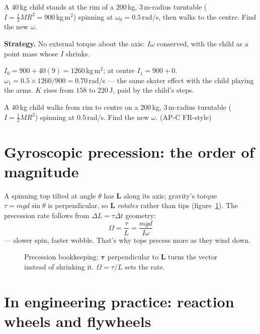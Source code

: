\begin{example}\label{ex:turntable}
A $40$\,kg child stands at the rim of a $200$\,kg, $3$\,m-radius
turntable ($I=\tfrac12MR^{2}=900$\,kg\,m$^{2}$) spinning at
$\omega_0=0.5$\,rad/s, then walks to the centre. Find the new $\omega$.
\par\smallskip
\textbf{Strategy.} No external torque about the axis: $I\omega$ conserved,
with the child as a point mass whose $I$ shrinks.
\begin{solution}
$I_0=900+40(9)=1260$\,kg\,m$^{2}$; at centre $I_1=900+0$.
$\omega_1=0.5\times1260/900=0.70$\,rad/s --- the same skater effect with
the child playing the arms. $K$ rises from $158$ to $220$\,J, paid by the
child's steps. \checkmark
\end{solution}
\end{example}

\begin{exercise}[medium]
A $40$\,kg child walks from rim to centre on a $200$\,kg, $3$\,m-radius
turntable ($I=\tfrac12MR^{2}$) spinning at $0.5$\,rad/s. Find the new
$\omega$. (AP-C FR-style)
\end{exercise}

\section{Gyroscopic precession: the order of magnitude}\label{sec:ang-gyro}

A spinning top tilted at angle $\theta$ has $\mathbf L$ along its axis;
gravity's torque $\tau=mgd\sin\theta$ is perpendicular, so $\mathbf L$
\emph{rotates} rather than tips (figure~\ref{fig:gyro}). The precession
rate follows from $\Delta L=\tau\Delta t$ geometry:
\[
  \Omega=\frac{\tau}{L}=\frac{mgd}{I\omega}
\]
--- slower spin, faster wobble. That's why tops precess more as they wind
down.

\begin{figure}[htbp]\centering

\caption{Precession bookkeeping: $\boldsymbol\tau$ perpendicular to
$\mathbf L$ turns the vector instead of shrinking it. $\Omega=\tau/L$ sets
the rate.}
\label{fig:gyro}
\end{figure}

\section{In engineering practice: reaction wheels and flywheels}\label{sec:ang-eng}

